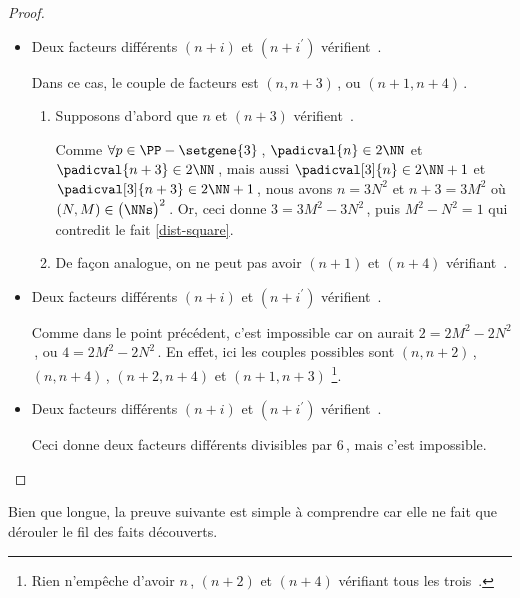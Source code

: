 \begin{proof}
\begin{itemize}
    	\medskip
		\item Deux facteurs différents $(n+i)$ et $(n+i^\prime)$ vérifient \,.
		
		\smallskip
		\noindent
		Dans ce cas, le couple de facteurs est $(n, n + 3)$\,, ou $(n + 1, n + 4)$\,.    
		\begin{enumerate}
			\item Supposons d'abord que $n$ et $(n+3)$ vérifient \,.
			
			\noindent
			Comme $\forall p \in \PP - \setgene{3}$\,, $\padicval{n} \in 2 \NN$ et $\padicval{n + 3} \in 2 \NN$\,,
			mais aussi $\padicval[3]{n} \in 2 \NN + 1$ et $\padicval[3]{n + 3} \in 2 \NN + 1$\,,
			nous avons $n = 3 N^2$ et $n+3 = 3 M^2$ où $(N, M) \in \big( \NNs \big)^2$\,.
			Or, ceci donne $3 = 3 M^2 - 3 N^2$\,, puis $M^2 - N^2 = 1$ qui contredit le fait \ref{dist-square}.

			\item De façon analogue, on ne peut pas avoir $(n+1)$ et $(n+4)$ vérifiant \,.
		\end{enumerate}


    	\medskip
		\item Deux facteurs différents $(n+i)$ et $(n+i^\prime)$ vérifient \,.
		
		\smallskip
		\noindent
		Comme dans le point précédent, c'est impossible car on aurait $2 = 2 M^2 - 2 N^2$\,, ou $4 = 2 M^2 - 2 N^2$\,. 
		En effet, ici les couples possibles sont $(n, n + 2)$\,, $(n, n + 4)$\,,  $(n + 2, n + 4)$ et $(n + 1, n + 3)$
		\footnote{
			Rien n'empêche d'avoir $n$\,, $(n + 2)$ et $(n + 4)$ vérifiant tous les trois \,.
		}.


    	\medskip
		\item Deux facteurs différents $(n+i)$ et $(n+i^\prime)$ vérifient \,.
		
		\smallskip
		\noindent
		Ceci donne deux facteurs différents divisibles par $6$\,, mais c'est impossible. \qedhere
    \end{itemize}
\end{proof}




Bien que longue, la preuve suivante est simple à comprendre car elle ne fait que dérouler le fil des faits découverts.


